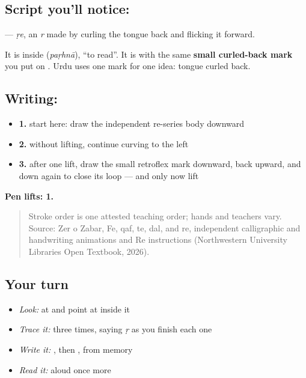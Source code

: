 \subsection*{Script you'll notice: }
\textbf{} — \emph{ṛe}, an \emph{r} made by curling the tongue back and flicking it forward.

It is inside \textbf{} (\emph{paṛhnā}), \textquotedblleft{}to read\textquotedblright{}. It is \textbf{} with the same \textbf{small curled-back mark} you put on \textbf{}. Urdu uses one mark for one idea: tongue curled back.

\subsection*{Writing: }

\begin{itemize}
\raggedright
  \item \textbf{1.} start here: draw the independent re-series body downward
  \item \textbf{2.} without lifting, continue curving to the left
  \item \textbf{3.} after one lift, draw the small retroflex mark downward, back upward, and down again to close its loop — and only now lift
\end{itemize}

\textbf{Pen lifts: 1.}

\begin{quote}
Stroke order is one attested teaching order; hands and teachers vary. Source: Zer o Zabar, Fe, qaf, te, dal, and re, independent  calligraphic and handwriting animations and Re instructions (Northwestern University Libraries Open Textbook, 2026).
\end{quote}

\subsection*{Your turn}
\begin{itemize}
\raggedright
  \item \emph{Look:} at \textbf{} and point at  inside it
  \item \emph{Trace it:}  three times, saying \emph{ṛ} as you finish each one
  \item \emph{Write it:} , then , from memory
  \item \emph{Read it:} \textbf{} aloud once more
\end{itemize}

